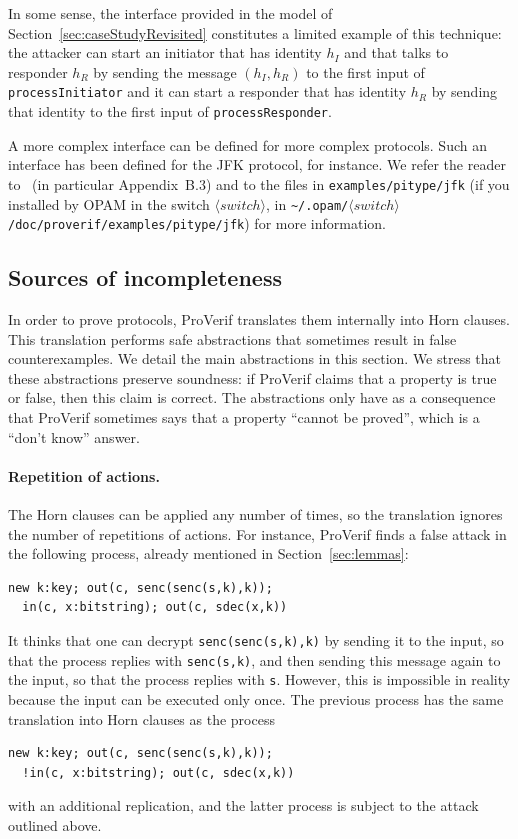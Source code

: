 \documentclass{book}
\newcommand{\nonterm}[1]{\langle\mathit{#1}\rangle}
\newcommand{\switchdir}{\nonterm{switch}}
\newcommand{\opamsubdir}[1]{\nolinkurl{~/.opam/}$\switchdir$\nolinkurl{/#1}}
\begin{document}
In some sense, the interface provided in the model of
Section~\ref{sec:caseStudyRevisited} constitutes a limited example of
this technique: the attacker can start an initiator that has identity
$h_I$ and that talks to responder $h_R$ by sending the message $(h_I,
h_R)$ to the first input of \lstinline!processInitiator! and it can
start a responder that has identity $h_R$ by sending that identity to
the first input of \lstinline!processResponder!.

A more complex interface can be defined for more complex protocols.
Such an interface has been defined for the JFK protocol, for instance.
We refer the reader to~\cite{Abadi07} (in particular Appendix~B.3) and
to the files in {\tt examples/pitype/jfk} (if you installed by OPAM
in the switch $\switchdir$, in \opamsubdir{doc/proverif/examples/pitype/jfk})
for more information.


\subsection{Sources of incompleteness}\label{sec:incomplete}

In order to prove protocols, ProVerif translates them internally into
Horn clauses. This translation performs safe abstractions that
sometimes result in false counterexamples. We detail the main
abstractions in this section. We stress that these abstractions
preserve soundness: if ProVerif claims that a property is true or
false, then this claim is correct. The abstractions only have as a
consequence that ProVerif sometimes says that a property ``cannot be
proved'', which is a ``don't know'' answer.

\paragraph{Repetition of actions.}

The Horn clauses can be applied any number of times, so the
translation ignores the number of repetitions of actions.
For instance, ProVerif finds a false attack in the following process,
already mentioned in Section~\ref{sec:lemmas}:
\begin{lstlisting}[numbers=none]
  new k:key; out(c, senc(senc(s,k),k));
  in(c, x:bitstring); out(c, sdec(x,k))
\end{lstlisting}
It thinks that one can decrypt \lstinline!senc(senc(s,k),k)! by sending
it to the input, so that the process replies with \lstinline!senc(s,k)!,
and then sending this message again to the input, so that the process
replies with \lstinline!s!. However, this is impossible in reality
because the input can be executed only once.
The previous process has the same translation into Horn clauses as
the process
\begin{lstlisting}[numbers=none]
  new k:key; out(c, senc(senc(s,k),k));
  !in(c, x:bitstring); out(c, sdec(x,k))
\end{lstlisting}
with an additional replication, and the latter process is subject to the
attack outlined above.
\end{document}
